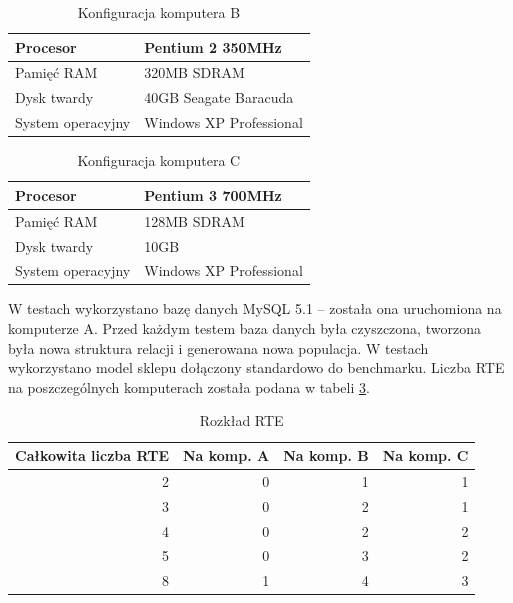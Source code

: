 \begin{table}[h]
\caption{Konfiguracja komputera B}\label{tab:kompb}
\begin{center}
\begin{tabular}{|l|l|}
\hline
Procesor&Pentium 2 350MHz\\
\hline
Pamięć RAM&320MB SDRAM\\
\hline
Dysk twardy&40GB Seagate Baracuda\\
\hline
System operacyjny&Windows XP Professional\\
\hline
\end{tabular}
\end{center}
\end{table}

\begin{table}[h]
\caption{Konfiguracja komputera C}\label{tab:kompc}
\begin{center}
\begin{tabular}{|l|l|}
\hline
Procesor&Pentium 3 700MHz\\
\hline
Pamięć RAM&128MB SDRAM\\
\hline
Dysk twardy&10GB\\
\hline
System operacyjny&Windows XP Professional\\
\hline
\end{tabular}
\end{center}
\end{table}

W testach wykorzystano bazę danych MySQL 5.1 -- została ona uruchomiona na komputerze A.
Przed każdym testem baza danych była czyszczona, tworzona była nowa struktura relacji i generowana nowa populacja.
W testach wykorzystano model sklepu dołączony standardowo do benchmarku. Liczba RTE na poszczególnych komputerach 
została podana w tabeli \ref{tab:rterozkl}.

\begin{table}[h]
\caption{Rozkład RTE}\label{tab:rterozkl}
\begin{center}
\begin{tabular}{|r|r|r|r|}
\hline
Całkowita liczba RTE&Na komp. A&Na komp. B&Na komp. C\\
\hline
2&0&1&1\\
\hline
3&0&2&1\\
\hline
4&0&2&2\\
\hline
5&0&3&2\\
\hline
8&1&4&3\\
\hline
\end{tabular}
\end{center}
\end{table}

